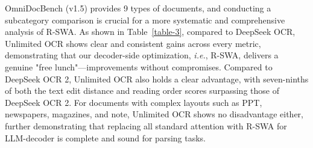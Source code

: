 \documentclass[11pt, a4paper, logo, copyright, nonumbering]{deepseek}
\begin{document}
\begin{CJK*}{UTF8}{gbsn}
OmniDocBench (v1.5) provides 9 types of documents, and conducting a subcategory comparison is crucial for a more systematic and comprehensive analysis of R-SWA. As shown in Table~\ref{table-3}, compared to DeepSeek OCR, Unlimited OCR shows clear and consistent gains across every metric, demonstrating that our decoder-side optimization, \textit{i.e.}, R-SWA, delivers a genuine "free lunch"—improvements without compromises. Compared to DeepSeek OCR 2, Unlimited OCR also holds a clear advantage, with seven-ninths of both the text edit distance and reading order scores surpassing those of DeepSeek OCR 2. For documents with complex layouts such as PPT, newspapers, magazines, and note, Unlimited OCR shows no disadvantage either, further demonstrating that replacing all standard attention with R-SWA for LLM-decoder is complete and sound for parsing tasks.


\begin{table}[ht]\small
    \centering	

    \caption{Detailed subcategory comparison between Unlimited OCR and the DeepSeek-OCR series across nine document types. R-order denotes reading order. All metrics are edit distances, where lower is better. Red cells indicate that the corresponding metric of DeepSeek-OCR or DeepSeek-OCR 2 is better than that of Unlimited OCR.}
    \setlength{\abovecaptionskip}{0.2cm}
\end{table}
\end{CJK*}
\end{document}
